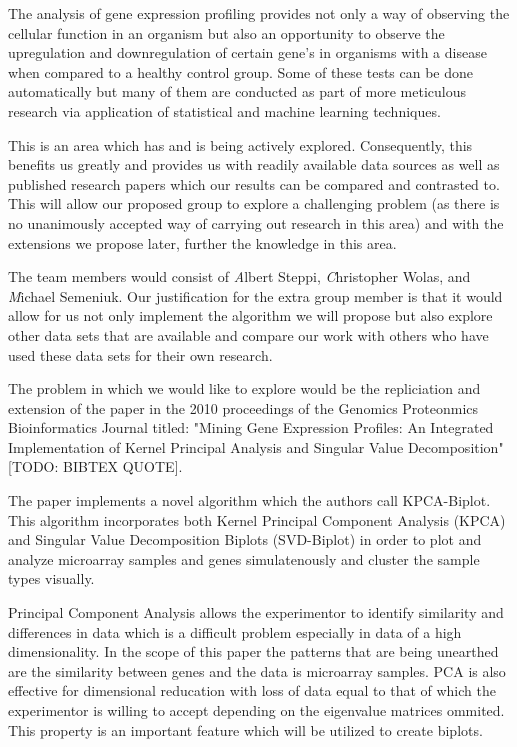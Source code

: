 \documentclass[10pt,a4,oneside]{report}
\begin{document}
The analysis of gene expression profiling provides not only a way of observing the cellular function in an organism but also an opportunity to observe the upregulation and downregulation of certain gene's in organisms with a disease  when compared to a healthy control group. Some of these tests can be done automatically but many of them are conducted as part of more meticulous  research via application of statistical and machine learning techniques.

This is an area which has and is being actively explored. Consequently, this benefits us greatly and provides us with readily available data sources as well as published research papers which our results can be compared and contrasted to. This will allow our proposed group to explore a challenging problem (as there is no unanimously accepted way of carrying out research in this area) and with the extensions we propose later, further the knowledge in this area.

The team members would consist of { \emph Albert Steppi}, {\emph Christopher Wolas}, and {\emph Michael Semeniuk}. Our justification for the extra group member is that it would allow for us not only implement the algorithm we will propose but also explore other data sets that are available and compare
our work with others who have used these data sets for their own research.

The problem in which we would like to explore would be the repliciation and extension of the paper in the 2010 proceedings of the
Genomics Proteonmics Bioinformatics Journal titled: "Mining Gene Expression Profiles: An Integrated Implementation of Kernel Principal
Analysis and Singular Value Decomposition" [TODO: BIBTEX QUOTE].

The paper implements a novel algorithm which the authors call KPCA-Biplot. This algorithm incorporates both Kernel Principal Component Analysis (KPCA) and Singular Value Decomposition Biplots (SVD-Biplot) in order to plot and analyze microarray samples and genes simulatenously and cluster the sample types visually. %

Principal Component Analysis  allows the experimentor to identify similarity and differences in data which is a difficult problem especially in data of a high dimensionality. In the scope of this paper the patterns that are being unearthed are the similarity between genes and the data is microarray samples. PCA is also effective for dimensional reducation with loss of data equal to that of which the experimentor is willing to accept depending on the eigenvalue matrices ommited. This property is an important feature which will be utilized to create biplots.
\end{document}
